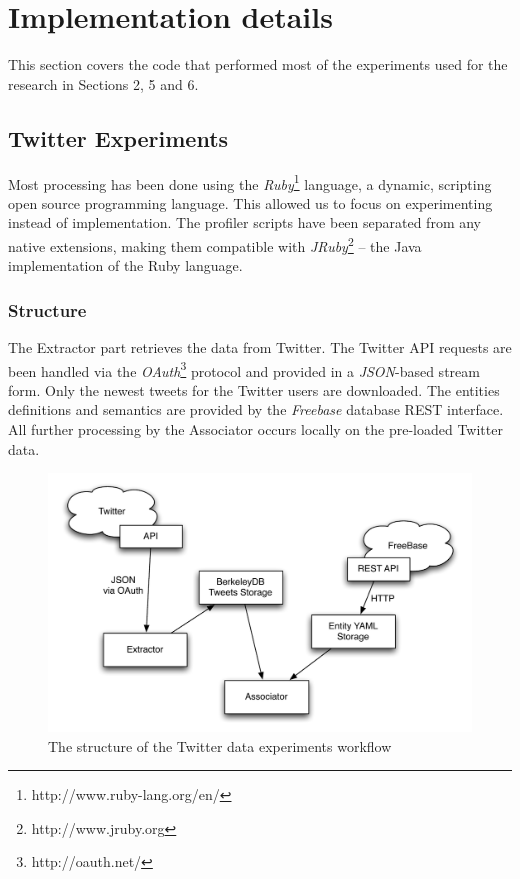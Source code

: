 \section{Implementation details}
This section covers the code that performed most of the experiments used for the research in Sections 2, 5 and 6.

\subsection{Twitter Experiments}
Most processing has been done using the \textit{Ruby}\footnote{http://www.ruby-lang.org/en/}
language, a dynamic, scripting open source programming language. This allowed us
to focus on experimenting instead of implementation. The profiler scripts have been
separated from any native extensions, making them compatible with \textit{JRuby}\footnote{http://www.jruby.org} -- the Java implementation
of the Ruby language.
\subsubsection{Structure}
The Extractor part retrieves the data from Twitter. The Twitter API requests are been handled via the \textit{OAuth}\footnote{http://oauth.net/} protocol and provided in a
\textit{JSON}-based stream form. Only the newest tweets for the Twitter
users are downloaded. The entities definitions and semantics are provided by
the \textit{Freebase} database REST interface. All further processing by the Associator
occurs locally on the pre-loaded Twitter data. \\

\begin{figure}[h!]
  \begin{center}
	  \includegraphics[scale=0.65]{images/twitter_diagram.pdf}
	  \caption{The structure of the Twitter data experiments workflow}
  \end{center}
\end{figure}

